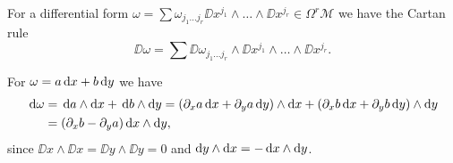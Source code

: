 \begin{bem}
	For a differential form 
	$\omega = \sum \omega_{j_1 \ldots j_r} \DD x^{j_1} \wedge \ldots \wedge \DD x^{j_r} \in \Omega^r \mathscr{M}$ we have the Cartan rule
	\begin{equation}
		\DD \omega 
		= \sum \DD \omega_{j_1 \ldots j_r} \wedge \DD x^{j_1} \wedge \ldots \wedge \DD x^{j_r}
		.
	\end{equation}
	\cite[307]{Teubner-Taschenbuch-1}
\end{bem}

\begin{beispiel}
	\cite[307]{Teubner-Taschenbuch-1}
	For $\omega = a \,\mathrm{d} x + b \,\mathrm{d} y$ we have
	\begin{align}
		\,\mathrm{d} \omega
		& 
		= \,\mathrm{d} a \wedge \mathrm{d} x + \,\mathrm{d} b \wedge \mathrm{d} y
		= (\partial_x a \,\mathrm{d} x + \partial_y a \,\mathrm{d} y) \wedge \mathrm{d} x
		+ (\partial_x b \,\mathrm{d} x + \partial_y b \,\mathrm{d} y) \wedge \mathrm{d} y
		\nonumber \\
		&
		= (\partial_x b - \partial_y a) \,\mathrm{d} x \wedge \mathrm{d} y,		
	\end{align}
	since $\DD x \wedge \DD x = \DD y\wedge \DD y = 0$ and $\mathrm{d} y \wedge \mathrm{d} x = - \,\mathrm{d} x \wedge \mathrm{d} y$.
\end{beispiel}




